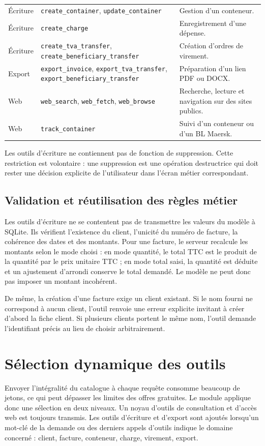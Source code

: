 \documentclass[12pt,a4paper,oneside]{report}
\newcommand{\code}[1]{\texttt{#1}}
\begin{document}
\begin{longtable}{p{3.2cm}p{5.8cm}p{5.2cm}}
Écriture & \code{\footnotesize create\_container}, \code{\footnotesize update\_container} & Gestion d'un conteneur.\\
Écriture & \code{\footnotesize create\_charge} & Enregistrement d'une dépense.\\
Écriture & \code{\footnotesize create\_tva\_transfer}, \code{\footnotesize create\_beneficiary\_transfer} & Création d'ordres de virement.\\
Export & \code{\footnotesize export\_invoice}, \code{\footnotesize export\_tva\_transfer}, \code{\footnotesize export\_beneficiary\_transfer} & Préparation d'un lien PDF ou DOCX.\\
Web & \code{\footnotesize web\_search}, \code{\footnotesize web\_fetch}, \code{\footnotesize web\_browse} & Recherche, lecture et navigation sur des sites publics.\\
Web & \code{\footnotesize track\_container} & Suivi d'un conteneur ou d'un BL Maersk.\\
\bottomrule
\end{longtable}

Les outils d'écriture ne contiennent pas de fonction de suppression. Cette restriction est volontaire : une suppression est une opération destructrice qui doit rester une décision explicite de l'utilisateur dans l'écran métier correspondant.

\subsection{Validation et réutilisation des règles métier}
Les outils d'écriture ne se contentent pas de transmettre les valeurs du modèle à SQLite. Ils vérifient l'existence du client, l'unicité du numéro de facture, la cohérence des dates et des montants. Pour une facture, le serveur recalcule les montants selon le mode choisi : en mode quantité, le total TTC est le produit de la quantité par le prix unitaire TTC ; en mode total saisi, la quantité est déduite et un ajustement d'arrondi conserve le total demandé. Le modèle ne peut donc pas imposer un montant incohérent.

De même, la création d'une facture exige un client existant. Si le nom fourni ne correspond à aucun client, l'outil renvoie une erreur explicite invitant à créer d'abord la fiche client. Si plusieurs clients portent le même nom, l'outil demande l'identifiant précis au lieu de choisir arbitrairement.

\section{Sélection dynamique des outils}
Envoyer l'intégralité du catalogue à chaque requête consomme beaucoup de jetons, ce qui peut dépasser les limites des offres gratuites. Le module applique donc une sélection en deux niveaux. Un noyau d'outils de consultation et d'accès web est toujours transmis. Les outils d'écriture et d'export sont ajoutés lorsqu'un mot-clé de la demande ou des derniers appels d'outils indique le domaine concerné : client, facture, conteneur, charge, virement, export.
\end{document}
